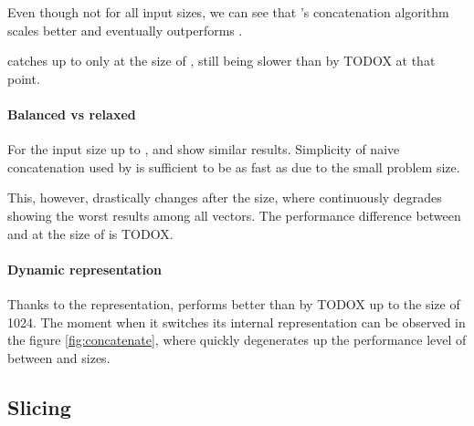 Even though not for all input sizes, we can see that \rrbvec{}'s concatenation algorithm scales better and eventually outperforms \stdvec{}. 

\imrsvec{} catches up to \stdvec{} only at the size of , still being slower than \rrbvec{} by TODOX at that point. 

\paragraph{Balanced vs relaxed}
For the input size up to , \rbvec{} and \rrbvec{} show similar results. Simplicity of naive concatenation used by \rbvec{} is sufficient to be as fast as \rrbvec{} due to the small problem size. 

This, however, drastically changes after the  size, where \rbvec{} continuously degrades showing the worst results among all vectors. The performance difference between \rbvec{} and \rrbvec{} at the size of  is TODOX. 

\paragraph{Dynamic representation}
Thanks to the \stdvec{} representation, \pvec{} performs better than \rrbvec{} by TODOX up to the size of 1024. The moment when it switches its internal representation can be observed in the figure \ref{fig:concatenate}, where \pvec{} quickly degenerates up the performance level of \rrbvec{} between  and  sizes. 


\subsection{Slicing}

